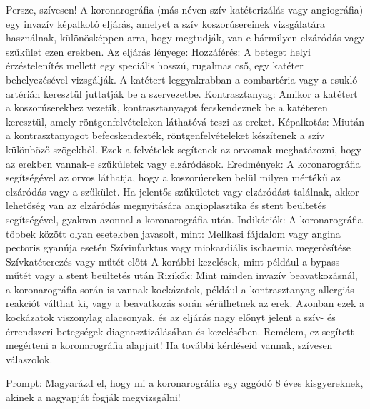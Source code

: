 \documentclass{article}
\begin{document}
\begin{multicols}{2}
Persze, szívesen!
A koronarográfia (más néven szív katéterizálás vagy angiográfia) egy invazív képalkotó eljárás, amelyet a szív koszorúsereinek vizsgálatára használnak, különösképpen arra, hogy megtudják, van-e bármilyen elzáródás vagy szűkület ezen erekben.
Az eljárás lényege:
Hozzáférés: A beteget helyi érzéstelenítés mellett egy speciális hosszú, rugalmas cső, egy katéter behelyezésével vizsgálják. A katétert leggyakrabban a combartéria vagy a csukló artérián keresztül juttatják be a szervezetbe.
Kontrasztanyag: Amikor a katétert a koszorúserekhez vezetik, kontrasztanyagot fecskendeznek be a katéteren keresztül, amely röntgenfelvételeken láthatóvá teszi az ereket.
Képalkotás: Miután a kontrasztanyagot befecskendezték, röntgenfelvételeket készítenek a szív különböző szögekből. Ezek a felvételek segítenek az orvosnak meghatározni, hogy az erekben vannak-e szűkületek vagy elzáródások.
Eredmények: A koronarográfia segítségével az orvos láthatja, hogy a koszorúereken belül milyen mértékű az elzáródás vagy a szűkület. Ha jelentős szűkületet vagy elzáródást találnak, akkor lehetőség van az elzáródás megnyitására angioplasztika és stent beültetés segítségével, gyakran azonnal a koronarográfia után.
Indikációk: A koronarográfia többek között olyan esetekben javasolt, mint:
Mellkasi fájdalom vagy angina pectoris gyanúja esetén
Szívinfarktus vagy miokardiális ischaemia megerősítése
Szívkatéterezés vagy műtét előtt
A korábbi kezelések, mint például a bypass műtét vagy a stent beültetés után
Rizikók: Mint minden invazív beavatkozásnál, a koronarográfia során is vannak kockázatok, például a kontrasztanyag allergiás reakciót válthat ki, vagy a beavatkozás során sérülhetnek az erek. Azonban ezek a kockázatok viszonylag alacsonyak, és az eljárás nagy előnyt jelent a szív- és érrendszeri betegségek diagnosztizálásában és kezelésében.
Remélem, ez segített megérteni a koronarográfia alapjait! Ha további kérdéseid vannak, szívesen válaszolok.



Prompt: Magyarázd el, hogy mi a koronarográfia egy aggódó 8 éves kisgyereknek, akinek a nagyapját fogják megvizsgálni!


\end{multicols}
\end{document}
